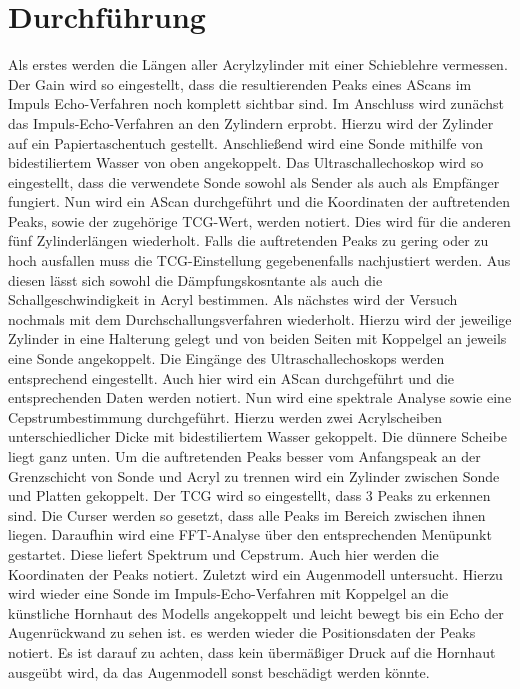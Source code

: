 
\section{Durchführung}
\label{sec:Durchführung}
Als erstes werden die Längen aller Acrylzylinder mit einer Schieblehre vermessen.
Der Gain wird so eingestellt, dass die resultierenden Peaks eines AScans im Impuls Echo-Verfahren
noch komplett sichtbar sind.
Im Anschluss wird zunächst das Impuls-Echo-Verfahren an den Zylindern erprobt.
Hierzu wird der Zylinder auf ein Papiertaschentuch gestellt. Anschließend wird eine Sonde
 mithilfe von bidestiliertem Wasser von oben angekoppelt. Das Ultraschallechoskop
 wird so eingestellt, dass die verwendete Sonde sowohl als Sender als auch als Empfänger fungiert.
 Nun wird ein AScan durchgeführt und die Koordinaten der auftretenden Peaks, sowie der zugehörige TCG-Wert, werden notiert.
 Dies wird für die anderen fünf Zylinderlängen wiederholt. Falls die auftretenden
 Peaks zu gering oder zu hoch ausfallen muss die TCG-Einstellung gegebenenfalls nachjustiert werden.
 Aus diesen lässt sich sowohl die Dämpfungskosntante als auch die
 Schallgeschwindigkeit in Acryl bestimmen.
 Als nächstes wird der Versuch nochmals mit dem Durchschallungsverfahren wiederholt.
 Hierzu wird der jeweilige Zylinder in eine Halterung gelegt und von beiden
 Seiten mit Koppelgel an jeweils eine Sonde angekoppelt. Die Eingänge des Ultraschallechoskops
 werden entsprechend eingestellt. Auch hier wird ein AScan durchgeführt und die
 entsprechenden Daten werden notiert.
 Nun wird eine spektrale Analyse sowie eine Cepstrumbestimmung durchgeführt. Hierzu
 werden zwei Acrylscheiben unterschiedlicher Dicke mit bidestiliertem Wasser gekoppelt.
 Die dünnere Scheibe liegt ganz unten. Um die auftretenden Peaks besser vom
 Anfangspeak an der Grenzschicht von Sonde und Acryl zu trennen wird ein Zylinder
 zwischen Sonde und Platten gekoppelt. Der TCG wird so eingestellt, dass 3 Peaks zu erkennen sind.
 Die Curser werden so gesetzt, dass alle Peaks im Bereich zwischen ihnen liegen. Daraufhin wird eine
 FFT-Analyse über den entsprechenden Menüpunkt gestartet. Diese liefert Spektrum und Cepstrum.
 Auch hier werden die Koordinaten der Peaks notiert.
 Zuletzt wird ein Augenmodell untersucht. Hierzu wird wieder eine
 Sonde im Impuls-Echo-Verfahren mit Koppelgel an die künstliche Hornhaut des Modells angekoppelt
 und leicht bewegt bis ein Echo der Augenrückwand zu sehen ist. es werden wieder
 die Positionsdaten der Peaks notiert. Es ist darauf zu achten, dass kein übermäßiger
 Druck auf die Hornhaut ausgeübt wird, da das Augenmodell sonst beschädigt werden könnte.
